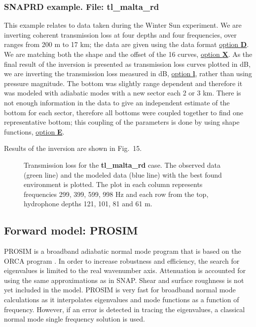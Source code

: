 \documentclass{saclantc}
\begin{document}
\subsubsection{SNAPRD example. File: {\bf tl\_malta\_rd}}
\label{se:malta}

This example relates to data taken during  
the Winter Sun experiment. We are inverting coherent transmission loss
at four depths and four frequencies, over ranges from 200 m to 17 km; the data
are given using the data format \underline{option {\bf D}}. We are
matching both the shape and the offset of the 16 curves,
\underline{option {\bf X}}. As the final result of the inversion is
presented as
transmission loss curves plotted in dB,
 we are inverting the transmission loss
measured in dB, \underline{option {\bf l}}, rather than using pressure
magnitude.
The bottom was slightly range dependent and therefore it was modeled
with adiabatic modes with a new sector each 2 or 3 km. There is not
enough information in the data to give an independent estimate of the
bottom for each sector, therefore all bottoms were coupled together to
find one representative bottom; this coupling of the parameters is
done by using shape functions, \underline{option {\bf E}}.

Results of the inversion are shown in Fig.~15.
\begin{figure}
\epsfxsize=13.5cm
\centerline{}
\caption{Transmission loss for the {\bf tl\_malta\_rd} case. The observed data
(green line) and the modeled data (blue line) with the best found 
environment is plotted.  The plot in each column represents frequencies  299, 399, 599,
998 Hz and 
each row from the top,  hydrophone depths 121, 101, 81 and  61  m.}
\label{fig:malta_fit}
\end{figure}

\subsection{Forward model: PROSIM }

{\sf PROSIM} \cite{prosim} is a broadband adiabatic normal mode program that is based on
the {\sf ORCA} program \cite{levinson:asa95,westwood:asa96}. 
In order to increase  robustness and efficiency,
the search for eigenvalues is limited to the real wavenumber axis.
Attenuation is accounted for using the same approximations as in {\sf SNAP}.
Shear and surface roughness is not yet included in the model.
{\sf PROSIM} is very fast for broadband normal mode calculations as it
interpolates eigenvalues and mode functions as  a function of frequency.
However, if an error is detected in tracing  the eigenvalues, a
classical normal mode single frequency solution is used.
\end{document}
